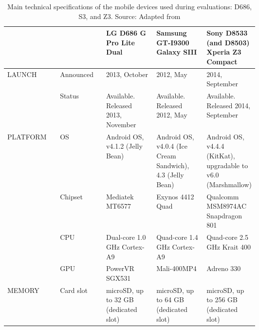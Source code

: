 \begin{longtable}{llp{0.2\linewidth}p{0.2\linewidth}p{0.2\linewidth}}
	\caption{Main technical specifications of the mobile devices used during evaluations: D686, S3, and Z3. Source: Adapted from \cite{GSMARENA2017-lg-s3-z3}} \\ \hline
	&               & LG D686 G Pro Lite Dual                              & Samsung GT-I9300 Galaxy SIII                                                                  & Sony D8533 (and D8503) Xperia Z3 Compact                                                          \\ \hline \endhead
	LAUNCH   & Announced     & 2013, October                                   & 2012, May                                                                                   & 2014, September                                                                                                \\
	& Status        & Available. Released 2013, November              & Available. Released 2012, May                                                               & Available. Released 2014, September                                                                            \\ \hline
	PLATFORM & OS            & Android OS, v4.1.2 (Jelly Bean)                 & Android OS, v4.0.4 (Ice Cream Sandwich), 4.3 (Jelly Bean)                                   & Android OS, v4.4.4 (KitKat), upgradable to v6.0 (Marshmallow)                                                  \\
	& Chipset       & Mediatek MT6577                                 & Exynos 4412 Quad                                                                            & Qualcomm MSM8974AC Snapdragon 801                                                                              \\
	& CPU           & Dual-core 1.0 GHz Cortex-A9                     & Quad-core 1.4 GHz Cortex-A9                                                                 & Quad-core 2.5 GHz Krait 400                                                                                    \\
	& GPU           & PowerVR SGX531                                  & Mali-400MP4                                                                                 & Adreno 330                                                                                                     \\ \hline
	MEMORY   & Card slot     & microSD, up to 32 GB (dedicated slot)           & microSD, up to 64 GB (dedicated slot)                                                       & microSD, up to 256 GB (dedicated slot)                                                                         \\

\end{longtable}
